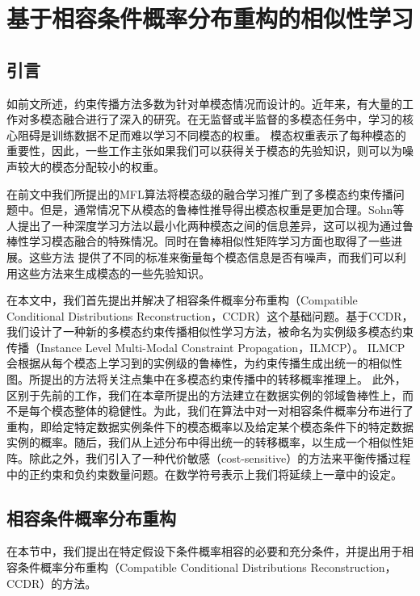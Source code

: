\chapter{基于相容条件概率分布重构的相似性学习}
\section{引言}
如前文所述，约束传播方法多数为针对单模态情况而设计的。近年来，有大量的工作对多模态融合进行了深入的研究\cite{lahat2015multimodal,poria2017ensemble,yu2017deep,poria2017review,liu2018weakly,kiela2018efficient}。在无监督或半监督的多模态任务中，学习的核心阻碍是训练数据不足而难以学习不同模态的权重。
模态权重表示了每种模态的重要性，因此，一些工作主张如果我们可以获得关于模态的先验知识，则可以为噪声较大的模态分配较小的权重\cite{kumar2011co,liu2013multi}。

在前文中我们所提出的MFL算法将模态级的融合学习推广到了多模态约束传播问题中。但是，通常情况下从模态的鲁棒性推导得出模态权重是更加合理。Sohn等人提出了一种深度学习方法以最小化两种模态之间的信息差异\cite{sohn2014improved}，这可以视为通过鲁棒性学习模态融合的特殊情况。同时在鲁棒相似性矩阵学习方面也取得了一些进展\cite{pavan2007dominant,premachandran2013consensus,zhu2014constructing}。这些方法
提供了不同的标准来衡量每个模态信息是否有噪声，而我们可以利用这些方法来生成模态的一些先验知识。

在本文中，我们首先提出并解决了相容条件概率分布重构（Compatible Conditional Distributions Reconstruction，CCDR）这个基础问题。基于CCDR，我们设计了一种新的多模态约束传播相似性学习方法，被命名为实例级多模态约束传播（Instance Level Multi-Modal Constraint Propagation，ILMCP）。
ILMCP会根据从每个模态上学习到的实例级的鲁棒性，为约束传播生成出统一的相似性图。所提出的方法将关注点集中在多模态约束传播中的转移概率推理上。
此外，区别于先前的工作，我们在本章所提出的方法建立在数据实例的邻域鲁棒性上，而不是每个模态整体的稳健性。为此，我们在算法中对一对相容条件概率分布进行了重构，即给定特定数据实例条件下的模态概率以及给定某个模态条件下的特定数据实例的概率。随后，我们从上述分布中得出统一的转移概率，以生成一个相似性矩阵。除此之外，我们引入了一种代价敏感（cost-sensitive）的方法来平衡传播过程中的正约束和负约束数量问题。在数学符号表示上我们将延续上一章中的设定。

\section{相容条件概率分布重构}
在本节中，我们提出在特定假设下条件概率相容的必要和充分条件，并提出用于相容条件概率分布重构（Compatible Conditional Distributions Reconstruction，CCDR）的方法。


